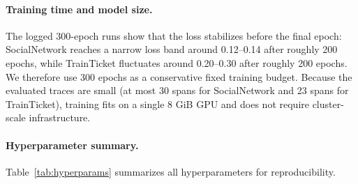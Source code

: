 \documentclass[sigconf,review]{acmart}
\begin{document}
\paragraph{Training time and model size.}
The logged 300-epoch runs show that the loss stabilizes before the final epoch: SocialNetwork reaches a narrow loss band around 0.12--0.14 after roughly 200 epochs, while TrainTicket fluctuates around 0.20--0.30 after roughly 200 epochs. We therefore use 300 epochs as a conservative fixed training budget. Because the evaluated traces are small (at most 30 spans for SocialNetwork and 23 spans for TrainTicket), training fits on a single 8 GiB GPU and does not require cluster-scale infrastructure.

\paragraph{Hyperparameter summary.}
Table~\ref{tab:hyperparams} summarizes all hyperparameters for reproducibility.

\begin{table}
\centering
\color{blue}
\caption{\textcolor{blue}{Hyperparameter settings used in the reported VAE experiments.}}
\label{tab:hyperparams}
\end{table}
\endgroup
\end{document}
